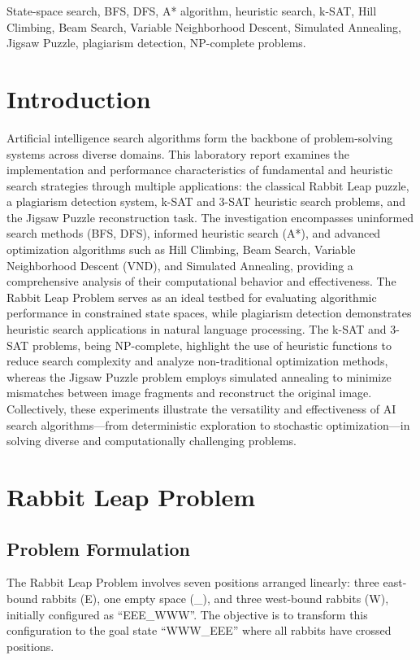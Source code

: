 \documentclass[conference]{IEEEtran}
\begin{document}
\begin{IEEEkeywords}
State-space search, BFS, DFS, A* algorithm, heuristic search, k-SAT, Hill Climbing, Beam Search, Variable Neighborhood Descent, Simulated Annealing, Jigsaw Puzzle, plagiarism detection, NP-complete problems. 
\end{IEEEkeywords}

\section{Introduction}
Artificial intelligence search algorithms form the backbone of problem-solving systems across diverse domains. This laboratory report examines the implementation and performance characteristics of fundamental and heuristic search strategies through multiple applications: the classical Rabbit Leap puzzle, a plagiarism detection system, k-SAT and 3-SAT heuristic search problems, and the Jigsaw Puzzle reconstruction task. The investigation encompasses uninformed search methods (BFS, DFS), informed heuristic search (A*), and advanced optimization algorithms such as Hill Climbing, Beam Search, Variable Neighborhood Descent (VND), and Simulated Annealing, providing a comprehensive analysis of their computational behavior and effectiveness. The Rabbit Leap Problem serves as an ideal testbed for evaluating algorithmic performance in constrained state spaces, while plagiarism detection demonstrates heuristic search applications in natural language processing. The k-SAT and 3-SAT problems, being NP-complete, highlight the use of heuristic functions to reduce search complexity and analyze non-traditional optimization methods, whereas the Jigsaw Puzzle problem employs simulated annealing to minimize mismatches between image fragments and reconstruct the original image. Collectively, these experiments illustrate the versatility and effectiveness of AI search algorithms—from deterministic exploration to stochastic optimization—in solving diverse and computationally challenging problems.

\section{Rabbit Leap Problem}

\subsection{Problem Formulation}
The Rabbit Leap Problem involves seven positions arranged linearly: three east-bound rabbits (E), one empty space (\_), and three west-bound rabbits (W), initially configured as ``EEE\_WWW''. The objective is to transform this configuration to the goal state ``WWW\_EEE'' where all rabbits have crossed positions.
\end{document}
